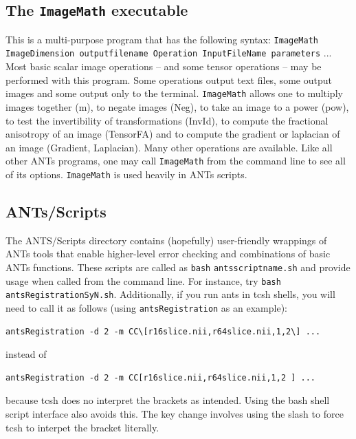 \documentclass{InsightArticle}
\begin{document}
\subsection{The \texttt{ImageMath} executable} This is a multi-purpose program
that has the following syntax:  \texttt{ImageMath ImageDimension
outputfilename   Operation  InputFileName  parameters} ...  Most basic
scalar image operations -- and some tensor operations -- may be
performed with this program.  Some operations output text files, some
output images and some output only to the terminal.   \texttt{ImageMath} allows
one to multiply images together (m), to negate images (Neg), to take
an image to a power (pow), to test the invertibility of
transformations (InvId), to compute the fractional anisotropy of an
image (TensorFA) and to compute the gradient or laplacian of an image
(Gradient, Laplacian).   Many other operations are available.  Like all other ANTs programs, one may call \texttt{ImageMath} from the command line to see all of its options.   \texttt{ImageMath} is used heavily in ANTs scripts.  

\subsection{ANTs/Scripts} 
The ANTS/Scripts directory contains (hopefully) user-friendly
wrappings of ANTs tools that enable higher-level error checking and
combinations of basic ANTs functions.  These scripts are called as
\texttt{bash}  \texttt{antsscriptname.sh}  and provide usage when called
from the command line.  For instance, try \texttt{bash}  \texttt{antsRegistrationSyN.sh}.
Additionally, if you run ants in tcsh shells, you will need to call it
as follows (using \texttt{antsRegistration} as an example):
\begin{verbatim}
antsRegistration -d 2 -m CC\[r16slice.nii,r64slice.nii,1,2\] ...
\end{verbatim}
instead of
\begin{verbatim}
antsRegistration -d 2 -m CC[r16slice.nii,r64slice.nii,1,2 ] ...
\end{verbatim}
because tcsh does no interpret the brackets as intended.  Using the
bash shell script interface also avoids this.  The key change involves using the slash to force tcsh to 
interpet the bracket literally. 
\newpage
\end{document}

